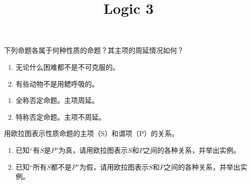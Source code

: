 \documentclass{ctexart}
\newif\ifpreface
\begin{document}
\large
\setlength{\baselineskip}{1.2em}
\ifpreface
  
\else
  \title{Logic 3}
  \maketitle
\fi
{}
\begin{problem}\label{pro:1}
  下列命题各属于何种性质的命题？其主项的周延情况如何？
  \begin{enumerate}
    \item 无论什么困难都不是不可克服的。
    \item 有些动物不是用鳃呼吸的。
  \end{enumerate}
\end{problem}
\begin{solution}
  \begin{enumerate}
    \item 全称否定命题。主项周延。
    \item 特称否定命题。主项不周延。
  \end{enumerate}
\end{solution}
\begin{problem}\label{pro:2}
  用欧拉图表示性质命题的主项（S）和谓项（P）的关系。
  \begin{enumerate}
    \item 已知``有\(S\)是\(P\)''为真，请用欧拉图表示\(S\)和\(P\)之间的各种关系，并举出实例。
    \item 已知``所有\(S\)都不是\(P\)''为假，请用欧拉图表示\(S\)和\(P\)之间的各种关系，并举出实例。
  \end{enumerate}
\end{problem}
\end{document}
